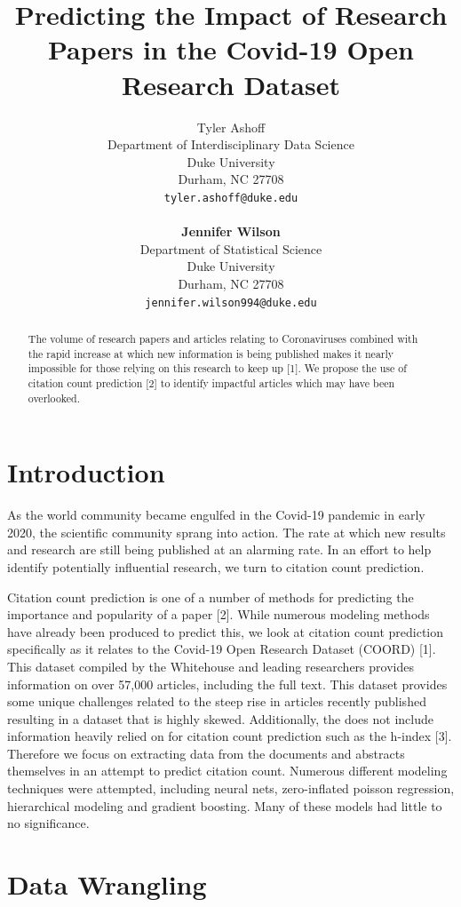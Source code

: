 \documentclass{article} %
\title{Predicting the Impact of Research Papers in the Covid-19 Open Research Dataset}
\author{
Tyler Ashoff \\
Department of Interdisciplinary Data Science\\
Duke University\\
Durham, NC 27708 \\
\texttt{tyler.ashoff@duke.edu} \\
\\
\textbf{Jennifer Wilson} \\
Department of Statistical Science\\
Duke University\\
Durham, NC 27708 \\
\texttt{jennifer.wilson994@duke.edu} \\
}
\begin{document}
\maketitle



\begin{abstract}
The volume of research papers and articles relating to Coronaviruses combined with the rapid increase at which new information is being published makes it nearly impossible for those relying on this research to keep up [1]. We propose the use of citation count prediction [2] to identify impactful articles which may have been overlooked.
\end{abstract}

\section{Introduction}

As the world community became engulfed in the Covid-19 pandemic in early 2020, the scientific community sprang into action. The rate at which new results and research are still being published at an alarming rate. In an effort to help identify potentially influential research, we turn to citation count prediction.

Citation count prediction is one of a number of methods for predicting the importance and popularity of a paper [2]. While numerous modeling methods have already been produced to predict this, we look at citation count prediction specifically as it relates to the Covid-19 Open Research Dataset (COORD) [1]. This dataset compiled by the Whitehouse and leading researchers provides information on over 57,000 articles, including the full text. This dataset provides some unique challenges related to the steep rise in articles recently published resulting in a dataset that is highly skewed. Additionally, the does not include information heavily relied on for citation count prediction such as the h-index [3]. Therefore we focus on extracting data from the documents and abstracts themselves in an attempt to predict citation count. Numerous different modeling techniques were attempted, including neural nets, zero-inflated poisson regression, hierarchical modeling and gradient boosting. Many of these models had little to no significance. 

\section{Data Wrangling}
\label{headings}
\end{document}
